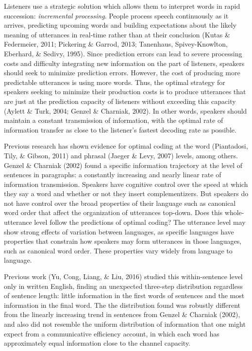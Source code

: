 \documentclass[10pt, letterpaper]{article}
\begin{document}
Listeners use a strategic solution which allows them to interpret words
in rapid succession: \emph{incremental processing}. People process
speech continuously as it arrives, predicting upcoming words and
building expectations about the likely meaning of utterances in
real-time rather than at their conclusion (Kutas \& Federmeier, 2011;
Pickering \& Garrod, 2013; Tanenhaus, Spivey-Knowlton, Eberhard, \&
Sedivy, 1995). Since prediction errors can lead to severe processing
costs and difficulty integrating new information on the part of
listeners, speakers should seek to minimize prediction errors. However,
the cost of producing more predictable utterances is using more words.
Thus, the optimal strategy for speakers seeking to minimize their
production costs is to produce utterances that are just at the
prediction capacity of listeners without exceeding this capacity (Aylett
\& Turk, 2004; Genzel \& Charniak, 2002). In other words, speakers
should maintain a constant transmission of information, with the optimal
rate of information transfer as close to the listener's fastest decoding
rate as possible.

Previous research has shown evidence for optimal coding at the word
(Piantadosi, Tily, \& Gibson, 2011) and phrasal (Jaeger \& Levy, 2007)
levels, among others. Genzel \& Charniak (2002) found a specific
information trajectory at the level of sentences in paragraphs: a
constantly increasing and nearly linear rate of information
transmission. Speakers have cognitive control over the speed at which
they say a word and whether or not they insert complementizers. But
speakers do not have control over the broad properties of their language
such as canonical word order that affect the organization of utterances
top-down. Does this whole-utterance level follow the predictions of
optimal coding? The utterance level may show strong effects of variation
between languages, as specific languages have properties that constrain
how speakers may form utterances in those languages, such as canonical
word order. These properties vary widely from language to language.

Previous work (Yu, Cong, Liang, \& Liu, 2016) studied this
within-sentence level only in written English, finding an unexpected
three-step distribution regardless of sentence length: little
information in the first words of sentences and the most information in
the final word. The the distribution found was robustly different from
the linearly increasing trend in sentences from Genzel \& Charniak
(2002), and also did not resemble the uniform distribution of
information that one might expect from a communicative efficiency
account, in which each word has approximately equal information close to
the channel capacity.
\end{document}
